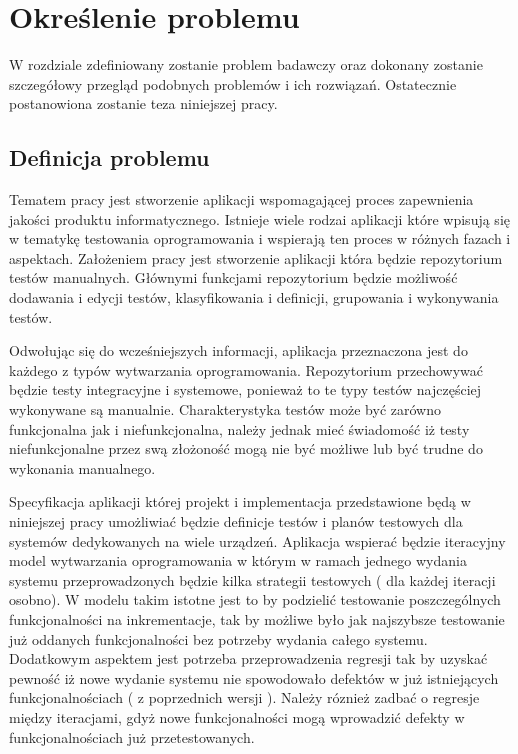 \chapter{Określenie problemu} 
\label{cha:okreslenie_problemu}

W rozdziale zdefiniowany zostanie problem badawczy oraz dokonany zostanie szczegółowy przegląd  podobnych problemów i ich rozwiązań. Ostatecznie postanowiona zostanie teza niniejszej pracy.

\section{Definicja problemu} 
\label{sec:definicja_problemu}

Tematem pracy jest stworzenie aplikacji wspomagającej proces zapewnienia jakości produktu informatycznego. Istnieje wiele rodzai aplikacji które wpisują się w tematykę testowania oprogramowania i wspierają ten proces w różnych fazach i aspektach. Założeniem pracy jest stworzenie aplikacji która będzie repozytorium testów manualnych. Głównymi funkcjami repozytorium będzie możliwość dodawania i edycji testów, klasyfikowania i definicji, grupowania i wykonywania  testów.


Odwołując się do wcześniejszych informacji, aplikacja przeznaczona jest do każdego z typów wytwarzania oprogramowania. Repozytorium przechowywać będzie testy integracyjne i systemowe, ponieważ to te typy testów najczęściej wykonywane są manualnie. Charakterystyka testów może być zarówno funkcjonalna jak i niefunkcjonalna, należy jednak mieć świadomość iż testy niefunkcjonalne przez swą złożoność mogą nie być możliwe lub być trudne do wykonania manualnego.

Specyfikacja aplikacji której projekt i implementacja przedstawione będą w niniejszej pracy umożliwiać będzie definicje testów i planów testowych dla systemów dedykowanych na wiele urządzeń. Aplikacja wspierać będzie iteracyjny model wytwarzania oprogramowania w którym w ramach jednego wydania systemu przeprowadzonych będzie kilka strategii testowych ( dla każdej iteracji osobno). W modelu takim istotne jest to by podzielić testowanie poszczególnych funkcjonalności na inkrementacje, tak by możliwe było jak najszybsze testowanie już oddanych funkcjonalności bez potrzeby wydania całego systemu. Dodatkowym aspektem jest potrzeba przeprowadzenia regresji tak by uzyskać pewność iż nowe wydanie systemu nie spowodowało defektów w już istniejących funkcjonalnościach ( z poprzednich wersji ). Należy róznież zadbać o regresje między iteracjami, gdyż nowe funkcjonalności mogą wprowadzić defekty w funkcjonalnościach już przetestowanych.

